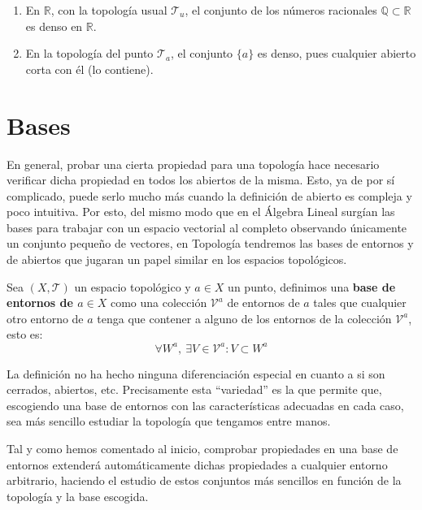 \begin{ej}
\begin{enumerate}
    \item En $\mathbb{R}$, con la topología usual $\mathcal{T}_u$, el conjunto de los números racionales $\mathbb{Q} \subset \mathbb{R}$ es denso en $\mathbb{R}$.
    \item En la topología del punto $\mathcal{T}_a$, el conjunto $\{a\}$ es denso, pues cualquier abierto corta con él (lo contiene).
\end{enumerate}
\end{ej}

\section{Bases}%
\label{sec:bases}
En general, probar una cierta propiedad para una topología hace necesario verificar dicha propiedad en todos los abiertos de la misma. Esto, ya de por sí complicado, puede serlo mucho más cuando la definición de abierto es compleja y poco intuitiva. Por esto, del mismo modo que en el Álgebra Lineal surgían las bases para trabajar con un espacio vectorial al completo observando únicamente un conjunto pequeño de vectores, en Topología tendremos las bases de entornos y de abiertos que jugaran un papel similar en los espacios topológicos.

\begin{defi}
Sea $(X, \mathcal{T})$ un espacio topológico y $a\in X$ un punto, definimos una \textbf{base de entornos de $a \in X$} como una colección $\mathcal{V}^a$ de entornos de $a$ tales que cualquier otro entorno de $a$ tenga que contener a alguno de los entornos de la colección $\mathcal{V}^a$, esto es:
\[
\forall W^a, \ \exists V \in \mathcal{V}^a : V \subset W^a
\]
\end{defi}

\begin{obs}
La definición no ha hecho ninguna diferenciación especial en cuanto a si son cerrados, abiertos, etc. Precisamente esta ``variedad'' es la que permite que, escogiendo una base de entornos con las características adecuadas en cada caso, sea más sencillo estudiar la topología que tengamos entre manos.

Tal y como hemos comentado al inicio, comprobar propiedades en una base de entornos extenderá automáticamente dichas propiedades a cualquier entorno arbitrario, haciendo el estudio de estos conjuntos más sencillos en función de la topología y la base escogida.
\end{obs}

